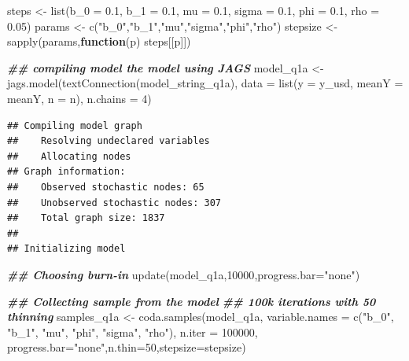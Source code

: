 \documentclass[
]{article}
\newenvironment{Shaded}{\begin{snugshade}}{\end{snugshade}}
\newcommand{\AttributeTok}[1]{\textcolor[rgb]{0.77,0.63,0.00}{#1}}
\newcommand{\ControlFlowTok}[1]{\textcolor[rgb]{0.13,0.29,0.53}{\textbf{#1}}}
\newcommand{\DecValTok}[1]{\textcolor[rgb]{0.00,0.00,0.81}{#1}}
\newcommand{\DocumentationTok}[1]{\textcolor[rgb]{0.56,0.35,0.01}{\textbf{\textit{#1}}}}
\newcommand{\FloatTok}[1]{\textcolor[rgb]{0.00,0.00,0.81}{#1}}
\newcommand{\FunctionTok}[1]{\textcolor[rgb]{0.00,0.00,0.00}{#1}}
\newcommand{\NormalTok}[1]{#1}
\newcommand{\OtherTok}[1]{\textcolor[rgb]{0.56,0.35,0.01}{#1}}
\newcommand{\StringTok}[1]{\textcolor[rgb]{0.31,0.60,0.02}{#1}}
\begin{document}
\begin{Shaded}
\begin{Highlighting}[]
\NormalTok{steps }\OtherTok{\textless{}{-}} \FunctionTok{list}\NormalTok{(}\AttributeTok{b\_0 =} \FloatTok{0.1}\NormalTok{, }\AttributeTok{b\_1 =} \FloatTok{0.1}\NormalTok{, }\AttributeTok{mu =} \FloatTok{0.1}\NormalTok{, }\AttributeTok{sigma =} \FloatTok{0.1}\NormalTok{, }\AttributeTok{phi =} \FloatTok{0.1}\NormalTok{, }\AttributeTok{rho =} \FloatTok{0.05}\NormalTok{)}
\NormalTok{params }\OtherTok{\textless{}{-}} \FunctionTok{c}\NormalTok{(}\StringTok{"b\_0"}\NormalTok{,}\StringTok{"b\_1"}\NormalTok{,}\StringTok{"mu"}\NormalTok{,}\StringTok{"sigma"}\NormalTok{,}\StringTok{"phi"}\NormalTok{,}\StringTok{"rho"}\NormalTok{)}
\NormalTok{stepsize }\OtherTok{\textless{}{-}} \FunctionTok{sapply}\NormalTok{(params,}\ControlFlowTok{function}\NormalTok{(p) steps[[p]])}

\DocumentationTok{\#\# compiling model the model using JAGS}
\NormalTok{model\_q1a }\OtherTok{\textless{}{-}} \FunctionTok{jags.model}\NormalTok{(}\FunctionTok{textConnection}\NormalTok{(model\_string\_q1a), }
                      \AttributeTok{data =} \FunctionTok{list}\NormalTok{(}\AttributeTok{y =}\NormalTok{ y\_usd, }\AttributeTok{meanY =}\NormalTok{ meanY,  }\AttributeTok{n =}\NormalTok{ n), }\AttributeTok{n.chains =} \DecValTok{4}\NormalTok{)}
\end{Highlighting}
\end{Shaded}

\begin{verbatim}
## Compiling model graph
##    Resolving undeclared variables
##    Allocating nodes
## Graph information:
##    Observed stochastic nodes: 65
##    Unobserved stochastic nodes: 307
##    Total graph size: 1837
## 
## Initializing model
\end{verbatim}

\begin{Shaded}
\begin{Highlighting}[]
\DocumentationTok{\#\# Choosing burn{-}in }
\FunctionTok{update}\NormalTok{(model\_q1a,}\DecValTok{10000}\NormalTok{,}\AttributeTok{progress.bar=}\StringTok{"none"}\NormalTok{)}


\DocumentationTok{\#\# Collecting sample from the model}
\DocumentationTok{\#\# 100k iterations with 50 thinning }
\NormalTok{samples\_q1a }\OtherTok{\textless{}{-}} \FunctionTok{coda.samples}\NormalTok{(model\_q1a, }\AttributeTok{variable.names =} \FunctionTok{c}\NormalTok{(}\StringTok{"b\_0"}\NormalTok{, }\StringTok{"b\_1"}\NormalTok{, }\StringTok{"mu"}\NormalTok{, }\StringTok{"phi"}\NormalTok{, }\StringTok{"sigma"}\NormalTok{, }\StringTok{"rho"}\NormalTok{), }\AttributeTok{n.iter =} \DecValTok{100000}\NormalTok{, }\AttributeTok{progress.bar=}\StringTok{"none"}\NormalTok{,}\AttributeTok{n.thin=}\DecValTok{50}\NormalTok{,}\AttributeTok{stepsize=}\NormalTok{stepsize)}
\end{Highlighting}
\end{Shaded}
\end{document}
